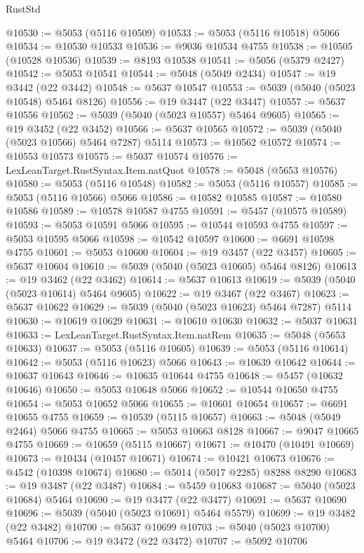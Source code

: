 \begin{lexlean}{RustStd}
\begin{coremodule}
@10530 := @5053 (@5116 @10509)
@10533 := @5053 (@5116 @10518) @5066
@10534 := @10530 @10533
@10536 := @9036 @10534 @4755
@10538 := @10505 (@10528 @10536)
@10539 := @8193 @10538
@10541 := @5056 (@5379 @2427)
@10542 := @5053 @10541
@10544 := @5048 (@5049 @2434)
@10547 := @19 @3442 (@22 @3442)
@10548 := @5637 @10547
@10553 := @5039 (@5040 (@5023 @10548) @5464 @8126)
@10556 := @19 @3447 (@22 @3447)
@10557 := @5637 @10556
@10562 := @5039 (@5040 (@5023 @10557) @5464 @9605)
@10565 := @19 @3452 (@22 @3452)
@10566 := @5637 @10565
@10572 := @5039 (@5040 (@5023 @10566) @5464 @7287) @5114
@10573 := @10562 @10572
@10574 := @10553 @10573
@10575 := @5037 @10574
@10576 := LexLeanTarget.RustSyntax.Item.natQuot
@10578 := @5048 (@5653 @10576)
@10580 := @5053 (@5116 @10548)
@10582 := @5053 (@5116 @10557)
@10585 := @5053 (@5116 @10566) @5066
@10586 := @10582 @10585
@10587 := @10580 @10586
@10589 := @10578 @10587 @4755
@10591 := @5457 (@10575 @10589)
@10593 := @5053 @10591 @5066
@10595 := @10544 @10593 @4755
@10597 := @5053 @10595 @5066
@10598 := @10542 @10597
@10600 := @6691 @10598 @4755
@10601 := @5053 @10600
@10604 := @19 @3457 (@22 @3457)
@10605 := @5637 @10604
@10610 := @5039 (@5040 (@5023 @10605) @5464 @8126)
@10613 := @19 @3462 (@22 @3462)
@10614 := @5637 @10613
@10619 := @5039 (@5040 (@5023 @10614) @5464 @9605)
@10622 := @19 @3467 (@22 @3467)
@10623 := @5637 @10622
@10629 := @5039 (@5040 (@5023 @10623) @5464 @7287) @5114
@10630 := @10619 @10629
@10631 := @10610 @10630
@10632 := @5037 @10631
@10633 := LexLeanTarget.RustSyntax.Item.natRem
@10635 := @5048 (@5653 @10633)
@10637 := @5053 (@5116 @10605)
@10639 := @5053 (@5116 @10614)
@10642 := @5053 (@5116 @10623) @5066
@10643 := @10639 @10642
@10644 := @10637 @10643
@10646 := @10635 @10644 @4755
@10648 := @5457 (@10632 @10646)
@10650 := @5053 @10648 @5066
@10652 := @10544 @10650 @4755
@10654 := @5053 @10652 @5066
@10655 := @10601 @10654
@10657 := @6691 @10655 @4755
@10659 := @10539 (@5115 @10657)
@10663 := @5048 (@5049 @2464) @5066 @4755
@10665 := @5053 @10663 @8128
@10667 := @9047 @10665 @4755
@10669 := @10659 (@5115 @10667)
@10671 := @10470 (@10491 @10669)
@10673 := @10434 (@10457 @10671)
@10674 := @10421 @10673
@10676 := @4542 (@10398 @10674)
@10680 := @5014 (@5017 @2285) @8288 @8290
@10683 := @19 @3487 (@22 @3487)
@10684 := @5459 @10683
@10687 := @5040 (@5023 @10684) @5464
@10690 := @19 @3477 (@22 @3477)
@10691 := @5637 @10690
@10696 := @5039 (@5040 (@5023 @10691) @5464 @5579)
@10699 := @19 @3482 (@22 @3482)
@10700 := @5637 @10699
@10703 := @5040 (@5023 @10700) @5464
@10706 := @19 @3472 (@22 @3472)
@10707 := @5092 @10706

\end{coremodule}
\end{lexlean}
